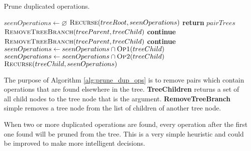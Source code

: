 \documentclass[12pt,a4paper,onecolumn,twoside,openright]{report}
\begin{document}
\begin{algorithm}[H]
	\caption{Prune duplicated operations.} \label{alg:prune_dup_ops}
	\small
	\begin{algorithmic}
			\State $seenOperations \gets \varnothing$
			\State $\Call{Recurse}{treeRoot, seenOperations}$
		\EndFor
		\State \textbf{return} $pairTrees$
	\EndFunction
	\\
				\State $\Call{RemoveTreeBranch}{treeParent, treeChild}$
				\State \textbf{continue}
				\State $\Call{RemoveTreeBranch}{treeParent, treeChild}$
				\State \textbf{continue}
			\Else
				\State $seenOperations \gets seenOperations \cap \Call{Op1}{treeChild}$
				\State $seenOperations \gets seenOperations \cap \Call{Op2}{treeChild}$	
				\State $\Call{Recurse}{treeChild, seenOperations}$
			\EndIf
		\EndFor
	\EndFunction
	\end{algorithmic}
\end{algorithm}
The purpose of Algorithm \ref{alg:prune_dup_ops} is to remove pairs which contain operations that are found elsewhere in the tree. \textbf{TreeChildren} returns a set of all child nodes to the tree node that is the argument. \textbf{RemoveTreeBranch} simple removes a tree node from the list of children of another tree node.

When two or more duplicated operations are found, every operation after the first one found will be pruned from the tree. This is a very simple heuristic and could be improved to make more intelligent decisions.
\\
\end{document}
